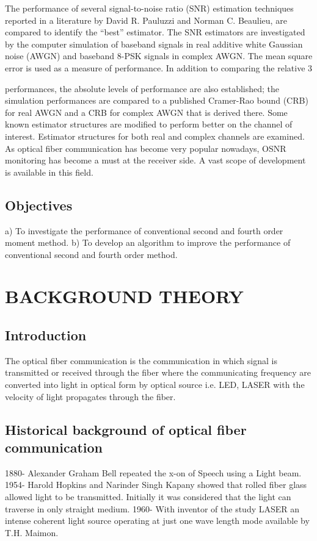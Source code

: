 \documentclass[12pt]{report}
\begin{document}
	
	The performance of several signal-to-noise ratio (SNR) estimation techniques reported in a literature by David R. Pauluzzi and Norman C. Beaulieu, are compared to identify the “best” estimator. The SNR estimators are investigated by the computer simulation of baseband signals in real additive white Gaussian noise (AWGN) and baseband 8-PSK signals in complex AWGN. The mean square error is used as a measure of performance. In addition to comparing the relative 
	3 
	
	performances, the absolute levels of performance are also established; the simulation performances are compared to a published Cramer-Rao bound (CRB) for real AWGN and a CRB for complex AWGN that is derived there. Some known estimator structures are modified to perform better on the channel of interest. Estimator structures for both real and complex channels are examined. 
	As optical fiber communication has become very popular nowadays, OSNR monitoring has become a must at the receiver side. A vast scope of development is available in this field.
	\section{Objectives }
	a) To investigate the performance of conventional second and fourth order moment method. b) To develop an algorithm to improve the performance of conventional second and fourth order method.
	
	
	\chapter{BACKGROUND THEORY}
	\section{Introduction}
	The optical fiber communication is the communication in which signal is transmitted or received through the fiber where the communicating frequency are converted into light in optical form by optical source i.e. LED, LASER with the velocity of light propagates through the fiber.
	\section{Historical background of optical fiber communication}
	1880- Alexander Graham Bell repeated the x-on of Speech using a Light beam. 
	1954- Harold Hopkins and Narinder Singh Kapany showed that rolled fiber glass allowed light to be transmitted. Initially it was considered that the light can traverse in only straight medium. 
	1960- With inventor of the study LASER an intense coherent light source operating at just one wave length mode available by T.H. Maimon. 
	
\end{document}
